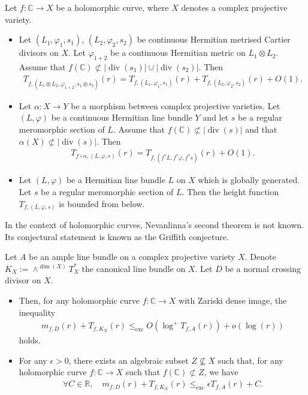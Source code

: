 \documentclass [11pt,reqno]{amsart}
\def\bC{{\mathbb{C}}}
\def\bR{{\mathbb{R}}}
\newcommand{\1}{\mathmybb{1}}
\def\div{\operatorname{div}}
\def\exc{\operatorname{exc}}
\begin{document}
\begin{proposition}
Let $f : \bC \to X$ be a holomorphic curve, where $X$ denotes a complex projective variety. 
\begin{itemize}
	\item[(1)] Let $(L_1,\varphi_1,s_1)$, $(L_2,\varphi_2,s_2)$ be continuous Hermitian metrised Cartier divisors on $X$. Let $\varphi_{1+2}$ be a continuous Hermitian metric on $L_1\otimes L_2$. Assume that $f(\bC) \not\subset |\div(s_1)|\cup|\div(s_2)|$. Then
	\begin{align*}
	T_{f,(L_1\otimes L_2,\varphi_{1+2},s_1 \otimes s_2)} (r) = T_{f,(L_1,\varphi_1,s_1)}(r) + T_{f,(L_2,\varphi_2,s_2)}(r) + O(1).
	\end{align*}
	\item[(2)] Let $\alpha : X \to Y$ be a morphism between complex projective varieties. Let $(L,\varphi)$ be a continuous Hermitian line bundle $Y$ and let $s$ be a regular meromorphic section of $L$. Assume that $f(\bC) \not\subset |\div(s)|$ and that $\alpha(X) \not\subset |\div(s)|$. Then
	\begin{align*}
	T_{f\circ \alpha,(L,\varphi,s)}(r) = T_{f,(f^{\ast}L,f^{\ast}\varphi,f^\ast s)}(r) + O(1).
	\end{align*}
	\item[(3)] Let $(L,\varphi)$ be a Hermitian line bundle $L$ on $X$ which is globally generated. Let $s$ be a regular meromorphic section of $L$. Then the height function $T_{f,(L,\varphi,s)}$ is bounded from below.
\end{itemize}
\end{proposition}

In the context of holomorphic curves, Nevanlinna's second theorem is not known. Its conjectural statement is known as the Griffith conjecture.
\begin{conjecture}
 Let $A$ be an ample line bundle on a complex projective variety $X$. Denote $K_X := \wedge^{\dim(X)}T_{X}^{\ast}$ the canonical line bundle on $X$. Let $D$ be a normal crossing divisor on $X$. 
\begin{itemize}
	\item[(1)] Then, for any holomorphic curve $f : \bC \to X$ with Zariski dense image, the inequality
\begin{align*}
m_{f,D}(r) + T_{f,K_X}(r) \leq_{\exc} O(\log^+ T_{f,A}(r)) + o(\log(r))
\end{align*}
holds.
	
	\item[(2)] For any $\epsilon>0$, there exists an algebraic subset $Z \nsubseteq X$ such that, for any holomorphic curve $f : \bC \to X$ such that $f(\bC) \not\subset Z$, we have 
\begin{align*}
\forall C\in \bR,\quad m_{f,D}(r) + T_{f,K_X}(r) \leq_{\exc} \epsilon T_{f,A}(r) + C.
\end{align*}
\end{itemize}
\end{conjecture}
\end{document}
